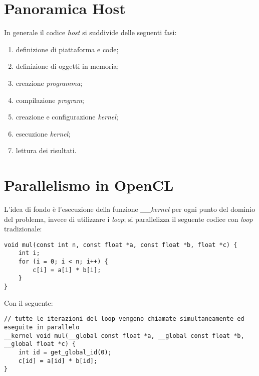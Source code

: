 \section{Panoramica Host}
In generale il codice \textit{host} si suddivide delle seguenti fasi:
\begin{enumerate}
	\item definizione di piattaforma e code;
	\item definizione di oggetti in memoria;
	\item creazione \textit{programma};
	\item compilazione \textit{program};
	\item creazione e configurazione \textit{kernel};
	\item esecuzione \textit{kernel};
	\item lettura dei risultati.
\end{enumerate}

\section{Parallelismo in OpenCL}
L'idea di fondo è l'esecuzione della funzione \textit{\_\_kernel} per ogni punto del dominio del problema, invece di utilizzare i \textit{loop}; si parallelizza il seguente codice con \textit{loop} tradizionale:
\begin{lstlisting}
void mul(const int n, const float *a, const float *b, float *c) {
	int i;
	for (i = 0; i < n; i++) {
		c[i] = a[i] * b[i];
	}
}
\end{lstlisting}
Con il seguente:
\begin{lstlisting}
// tutte le iterazioni del loop vengono chiamate simultaneamente ed eseguite in parallelo
__kernel void mul(__global const float *a, __global const float *b, __global float *c) {
	int id = get_global_id(0);
	c[id] = a[id] * b[id];
}
\end{lstlisting}

